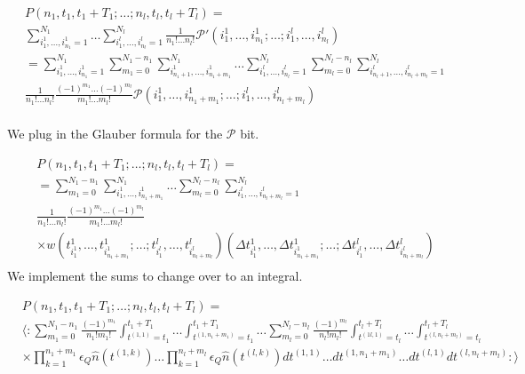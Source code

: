 \documentclass[12pt]{article}
\begin{document}
\begin{align}
&P(n_1,t_1,t_1+T_1;\ldots ;n_l,t_l,t_l+T_l) =\\
&\sum_{i^1_1, \ldots ,i^1_{n_1}=1}^{N_1} \ldots \sum_{i^l_1, \ldots ,i^l_{n_l}=1}^{N_l}\frac{1}{n_1! \ldots n_l!} \mathcal{P}'\left(i^1_1, \ldots ,i^1_{n_1}; \ldots ;i^l_1, \ldots ,i^l_{n_l}\right)\\
&=\sum_{i^1_1, \ldots ,i^1_{n_1}=1}^{N_1} \sum_{m_1=0}^{N_1-n_1} \sum_{i^1_{n_1+1}, \ldots ,i^1_{n_1+m_1}}^{N_1} \ldots \sum_{i^l_1, \ldots ,i^l_{n_l}=1}^{N_l} \sum_{m_l=0}^{N_l-n_l}\sum_{i^l_{n_l+1}, \ldots ,i^l_{n_l+m_l}=1}^{N_l}\\ 
&\frac{1}{n_1! \ldots n_l!}\frac{(-1)^{m_1}\ldots(-1)^{m_l}}{m_1! \ldots m_l!} \mathcal{P}\left(i^1_1, \ldots ,i^1_{n_1+m_1}; \ldots ;i^l_1, \ldots ,i^l_{n_l+m_l}\right)\\
\end{align}

We plug in the Glauber formula for the $\mathcal{P}$ bit.

\begin{align}
&P(n_1,t_1,t_1+T_1;\ldots ;n_l,t_l,t_l+T_l) =\\
&=\sum_{m_1=0}^{N_1-n_1} \sum_{i^1_1, \ldots ,i^1_{n_1+m_1}}^{N_1} \ldots \sum_{m_l=0}^{N_l-n_l}\sum_{i^l_{1}, \ldots ,i^l_{n_l+m_l}=1}^{N_l}\\ 
&\frac{1}{n_1! \ldots n_l!}\frac{(-1)^{m_1}\ldots(-1)^{m_l}}{m_1! \ldots m_l!}\\
&\times w(t^1_{i^1_1},\ldots ,t^1_{i^1_{n_1+m_1}};\ldots ; t^l_{i^l_1}, \ldots ,t^l_{i^l_{n_l+m_l}})(\Delta t^1_{i^1_1},\ldots ,\Delta t^1_{i^1_{n_1+m_1}};\ldots ; \Delta t^l_{i^l_1}, \ldots ,\Delta t^l_{i^l_{n_l+m_l}})\\
\end{align}
We implement the sums to change over to an integral.

\begin{align}
&P(n_1,t_1,t_1+T_1;\ldots ;n_l,t_l,t_l+T_l) =\\
&\Bigg\langle : \sum_{m_1=0}^{N_1-n_1} \frac{(-1)^{m_1}}{n_1 ! m_1!} \int_{t^{(1,1)}=t_1}^{t_1+T_1} \ldots \int_{t^{(1,n_1+m_1)}=t_1}^{t_1+T_1} \ldots \sum_{m_l=0}^{N_l-n_l} \frac{(-1)^{m_l}}{n_l ! m_l!} \int_{t^{(1l,1)}=t_l}^{t_l+T_l} \ldots \int_{t^{(l,n_l+m_l)}=t_l}^{t_l+T_l}\\
&\times \prod_{k=1}^{n_1+m_1} \epsilon_Q \hat{n}(t^{(1,k)}) \ldots \prod_{k=1}^{n_l+m_l} \epsilon_Q \hat{n}(t^{(l,k)}) dt^{(1,1)}\ldots dt^{(1,n_1+m_1)} \ldots dt^{(l,1)} dt^{(l,n_l+m_l)}:\Bigg\rangle
\end{align}
\end{document}
